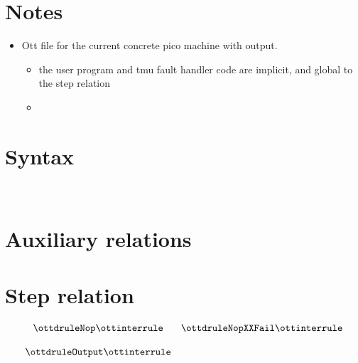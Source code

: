 \documentclass{article}
\begin{document}
\section*{Notes}

\begin{itemize}
\item Ott file for the current concrete pico machine with output.
  \begin{itemize}
    \item the user program and tmu fault handler code are implicit,
      and global to the step relation
    \item
  \end{itemize}
\end{itemize}

\section*{Syntax}

\ottmetavars\\[3ex]

\ottgrammartabular{
\ottn\ottinterrule
\ottL\ottinterrule
\otta\ottinterrule
\ottinstr\ottinterrule
\ottS\ottinterrule
}

\section*{Auxiliary relations}

\ottgrammartabular{
\ottformula\ottinterrule
}

\newpage
\section*{Step relation}


\[
\begin{array}{cc}
\ottdruleNop \ottinterrule & \ottdruleNopXXFail \ottinterrule \\ \\
\ottdruleOutput \ottinterrule & %
\end{array}
\]



\end{document}
